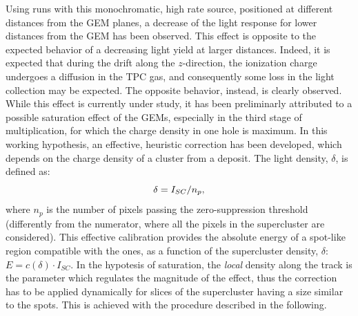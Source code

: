 Using runs with this monochromatic, high rate source, positioned at
different distances from the GEM planes, a decrease of the light
response for lower distances from the GEM has been observed. This
effect is opposite to the expected behavior of a decreasing light
yield at larger distances. Indeed, it is expected that during the
drift along the $z$-direction, the ionization charge undergoes a
diffusion in the TPC gas, and consequently some loss in the light
collection may be expected. The opposite behavior, instead, is clearly
observed. While this effect is currently under study, it has been
preliminarly attributed to a possible saturation effect of the GEMs,
especially in the third stage of multiplication, for which the charge
density in one hole is maximum.  In this working hypothesis, an
effective, heuristic correction has been developed, which depends on
the charge density of a cluster from a \fe deposit. The light density,
$\delta$, is defined as:
\begin{equation}
  \label{eq:density}
  \delta = I_{SC} / n_p,
\end{equation}
where $n_p$ is the number of pixels passing the zero-suppression
threshold (differently from the numerator, where all the pixels in the
supercluster are considered). This effective calibration provides the
absolute energy of a spot-like region compatible with the \fe ones, as
a function of the supercluster density, $\delta$: $E=c(\delta)\cdot
I_{SC}$. In the hypotesis of saturation, the
\textit{local} density along the track is the parameter which
regulates the magnitude of the effect, thus the correction has to be
applied dynamically for slices of the supercluster having a size
similar to the \fe spots.  This is achieved with the procedure
described in the following.

